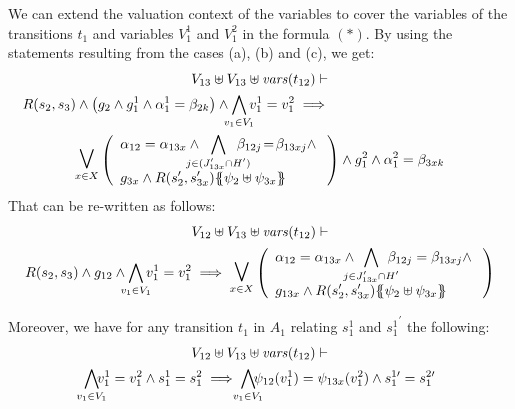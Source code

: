 \documentclass[runningheads]{llncs}
\begin{document}
\begin{enumerate}
We can extend the valuation context of the variables to cover the variables of the transitions $t_1$ and variables $V_1^1$ and $V_1^2$ in the formula $(*)$.
By using the statements resulting from the cases (a), (b) and (c), we get:
\begin{multline*}
V_{13} \uplus V_{13}  \uplus \fvars{t_{12}} \vdash\\
R\mpar{s_2, s_{3}} \wedge \mpar{g_2 \wedge g^1_1 \wedge \alpha^1_1=\beta_{2k}}\wedge \bigwedge_\subbox{v_1\in V_1}  v^1_1=v^2_1 %
\implies  \hspace{12em}\\
\operatorname*{\bigsymb{\bigvee}}_{x \in X} \mpar{\everymath{\displaystyle}
\begin{array}{l}
			\alpha_{12} = \alpha_{13x} \wedge \bigwedge_\subbox{j \in (J'_{13x} \cap H')} \beta_{12j}\! =\! \beta_{13xj}\nwedge\\
			  g_{3x} \wedge R\mpar{s'_2, s'_{3x}}\psubst{\psi_2 \uplus \psi_{3x}}
		\end{array}}  \wedge g^2_1 \wedge \alpha^2_1=\beta_{3xk} 
\end{multline*}	
That can be re-written as follows:
\begin{multline*}
V_{12} \uplus V_{13} \uplus \fvars{t_{12}}  \vdash\\
R\mpar{s_2, s_{3}} \wedge g_{12}  \land \bigwedge_\subbox{v_1\in V_1} v^1_1=v^2_1
\implies  \operatorname*{\bigsymb{\bigvee}}_{x \in X} \mpar{\everymath{\displaystyle}
\begin{array}{l}
			\alpha_{12} = \alpha_{13x} \wedge \bigwedge_\subbox{j \in J'_{13x} \cap H'} \beta_{12j} = \beta_{13xj} \nwedge\\
			g_{13x} \wedge R\mpar{s'_2, s'_{3x}}\psubst{\psi_2 \uplus \psi_{3x}}
		\end{array}}   
\end{multline*}	


Moreover, we have  for any transition $t_1 $ in $A_1$ relating $s^1_1$ and ${s^1_1}^{\prime}$ the following:
\begin{multline*}
V_{12} \uplus V_{13}  \uplus \fvars{t_{12}} \vdash\\
\bigwedge_\subbox{v_1\in V_1}\!\! v^1_1=v^2_1  \wedge s^1_1 = s^2_1 \implies \bigwedge_\subbox{v_1\in V_1}\!\! \psi_{12}(v^1_1)=\psi_{13x}(v^2_1)  \wedge s^{1\prime}_1 = s^{2\prime}_1 
\end{multline*}


\end{enumerate}
\end{document}
